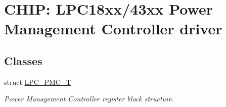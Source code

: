 \hypertarget{group___p_m_c__18_x_x__43_x_x}{}\section{C\+H\+IP\+: L\+P\+C18xx/43xx Power Management Controller driver}
\label{group___p_m_c__18_x_x__43_x_x}
\subsection*{Classes}
\begin{DoxyCompactItemize}
\item 
struct \hyperlink{struct_l_p_c___p_m_c___t}{L\+P\+C\+\_\+\+P\+M\+C\+\_\+T}
\begin{DoxyCompactList}\small\item\em Power Management Controller register block structure. \end{DoxyCompactList}\end{DoxyCompactItemize}
